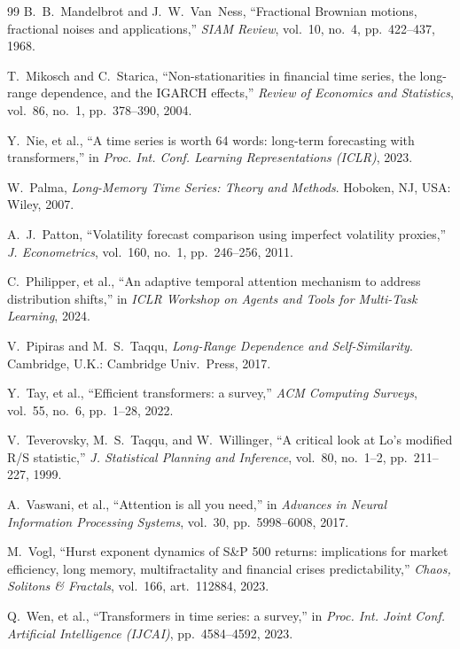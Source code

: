 \documentclass[journal]{IEEEtran}
\begin{document}
\begin{thebibliography}{99}
B.~B.~Mandelbrot and J.~W.~Van~Ness, ``Fractional Brownian motions, fractional noises and
applications,'' \textit{SIAM Review}, vol.~10, no.~4, pp.~422--437, 1968.

T.~Mikosch and C.~Starica, ``Non-stationarities in financial time series, the long-range
dependence, and the IGARCH effects,'' \textit{Review of Economics and Statistics}, vol.~86,
no.~1, pp.~378--390, 2004.

Y.~Nie, et al., ``A time series is worth 64 words: long-term forecasting with transformers,''
in \textit{Proc. Int. Conf. Learning Representations (ICLR)}, 2023.

W.~Palma, \textit{Long-Memory Time Series: Theory and Methods}. Hoboken, NJ, USA: Wiley, 2007.

A.~J.~Patton, ``Volatility forecast comparison using imperfect volatility proxies,''
\textit{J. Econometrics}, vol.~160, no.~1, pp.~246--256, 2011.

C.~Philipper, et al., ``An adaptive temporal attention mechanism to address distribution shifts,''
in \textit{ICLR Workshop on Agents and Tools for Multi-Task Learning}, 2024.

V.~Pipiras and M.~S.~Taqqu, \textit{Long-Range Dependence and Self-Similarity}. Cambridge, U.K.:
Cambridge Univ.\ Press, 2017.

Y.~Tay, et al., ``Efficient transformers: a survey,'' \textit{ACM Computing Surveys}, vol.~55,
no.~6, pp.~1--28, 2022.

V.~Teverovsky, M.~S.~Taqqu, and W.~Willinger, ``A critical look at Lo's modified R/S
statistic,'' \textit{J. Statistical Planning and Inference}, vol.~80, no.~1--2, pp.~211--227, 1999.

A.~Vaswani, et al., ``Attention is all you need,'' in \textit{Advances in Neural Information
Processing Systems}, vol.~30, pp.~5998--6008, 2017.

M.~Vogl, ``Hurst exponent dynamics of S\&P 500 returns: implications for market efficiency,
long memory, multifractality and financial crises predictability,'' \textit{Chaos, Solitons \&
Fractals}, vol.~166, art.~112884, 2023.

Q.~Wen, et al., ``Transformers in time series: a survey,'' in \textit{Proc. Int. Joint Conf.
Artificial Intelligence (IJCAI)}, pp.~4584--4592, 2023.


\end{thebibliography}
\end{document}
